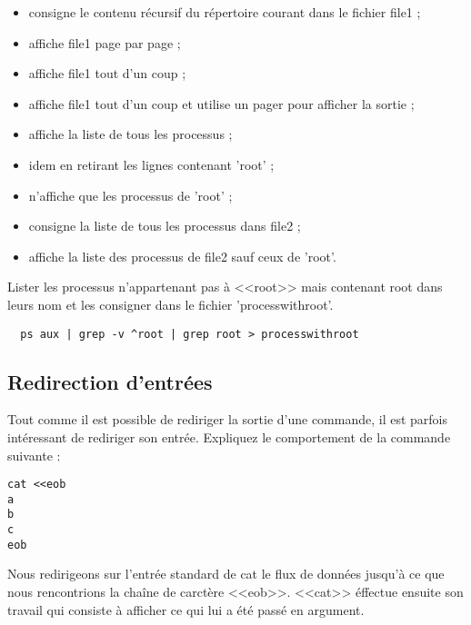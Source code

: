 \documentclass[11pt]{article}
\begin{document}
\begin{solution}
 \begin{itemize}
  \item consigne le contenu récursif du répertoire courant dans le fichier file1 ;
  \item affiche file1 page par page ;
  \item affiche file1 tout d'un coup ;
  \item affiche file1 tout d'un coup et utilise un pager pour afficher la sortie ;
  \item affiche la liste de tous les processus ;
  \item idem en retirant les lignes contenant 'root' ;
  \item n'affiche que les processus de 'root' ;
  \item consigne la liste de tous les processus dans file2 ;
  \item affiche la liste des processus de file2 sauf ceux de 'root'.
 \end{itemize}
\end{solution}

Lister les processus n'appartenant pas à <<root>> mais contenant root dans leurs nom et les consigner dans le fichier 'processwithroot'.

\begin{solution}
 \begin{verbatim}
  ps aux | grep -v ^root | grep root > processwithroot
 \end{verbatim}
\end{solution} 

\subsection{Redirection d'entrées}

Tout comme il est possible de rediriger la sortie d'une commande, il est parfois intéressant de rediriger son entrée. Expliquez le comportement de la commande suivante :

\begin{lstlisting}
cat <<eob
a
b
c
eob
\end{lstlisting}

\begin{solution}
Nous redirigeons sur l'entrée standard de cat le flux de données jusqu'à ce que nous rencontrions la chaîne de carctère <<eob>>. <<cat>> éffectue ensuite son travail qui consiste à afficher ce qui lui a été passé en argument.
\end{solution}
\end{document}

